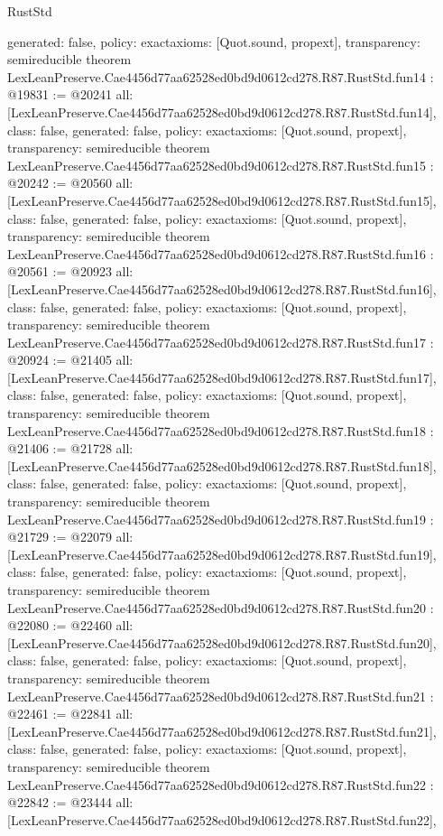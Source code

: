 \begin{lexlean}{RustStd}
\begin{coremodule}
{  generated: false,
  policy: exact{axioms: [Quot.sound, propext]},
  transparency: semireducible
}
theorem LexLeanPreserve.Cae4456d77aa62528ed0bd9d0612cd278.R87.RustStd.fun14 : @19831 := @20241 {
  all: [LexLeanPreserve.Cae4456d77aa62528ed0bd9d0612cd278.R87.RustStd.fun14],
  class: false,
  generated: false,
  policy: exact{axioms: [Quot.sound, propext]},
  transparency: semireducible
}
theorem LexLeanPreserve.Cae4456d77aa62528ed0bd9d0612cd278.R87.RustStd.fun15 : @20242 := @20560 {
  all: [LexLeanPreserve.Cae4456d77aa62528ed0bd9d0612cd278.R87.RustStd.fun15],
  class: false,
  generated: false,
  policy: exact{axioms: [Quot.sound, propext]},
  transparency: semireducible
}
theorem LexLeanPreserve.Cae4456d77aa62528ed0bd9d0612cd278.R87.RustStd.fun16 : @20561 := @20923 {
  all: [LexLeanPreserve.Cae4456d77aa62528ed0bd9d0612cd278.R87.RustStd.fun16],
  class: false,
  generated: false,
  policy: exact{axioms: [Quot.sound, propext]},
  transparency: semireducible
}
theorem LexLeanPreserve.Cae4456d77aa62528ed0bd9d0612cd278.R87.RustStd.fun17 : @20924 := @21405 {
  all: [LexLeanPreserve.Cae4456d77aa62528ed0bd9d0612cd278.R87.RustStd.fun17],
  class: false,
  generated: false,
  policy: exact{axioms: [Quot.sound, propext]},
  transparency: semireducible
}
theorem LexLeanPreserve.Cae4456d77aa62528ed0bd9d0612cd278.R87.RustStd.fun18 : @21406 := @21728 {
  all: [LexLeanPreserve.Cae4456d77aa62528ed0bd9d0612cd278.R87.RustStd.fun18],
  class: false,
  generated: false,
  policy: exact{axioms: [Quot.sound, propext]},
  transparency: semireducible
}
theorem LexLeanPreserve.Cae4456d77aa62528ed0bd9d0612cd278.R87.RustStd.fun19 : @21729 := @22079 {
  all: [LexLeanPreserve.Cae4456d77aa62528ed0bd9d0612cd278.R87.RustStd.fun19],
  class: false,
  generated: false,
  policy: exact{axioms: [Quot.sound, propext]},
  transparency: semireducible
}
theorem LexLeanPreserve.Cae4456d77aa62528ed0bd9d0612cd278.R87.RustStd.fun20 : @22080 := @22460 {
  all: [LexLeanPreserve.Cae4456d77aa62528ed0bd9d0612cd278.R87.RustStd.fun20],
  class: false,
  generated: false,
  policy: exact{axioms: [Quot.sound, propext]},
  transparency: semireducible
}
theorem LexLeanPreserve.Cae4456d77aa62528ed0bd9d0612cd278.R87.RustStd.fun21 : @22461 := @22841 {
  all: [LexLeanPreserve.Cae4456d77aa62528ed0bd9d0612cd278.R87.RustStd.fun21],
  class: false,
  generated: false,
  policy: exact{axioms: [Quot.sound, propext]},
  transparency: semireducible
}
theorem LexLeanPreserve.Cae4456d77aa62528ed0bd9d0612cd278.R87.RustStd.fun22 : @22842 := @23444 {
  all: [LexLeanPreserve.Cae4456d77aa62528ed0bd9d0612cd278.R87.RustStd.fun22],
}
\end{coremodule}
\end{lexlean}
